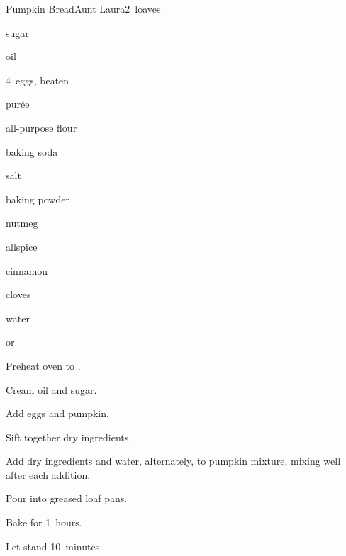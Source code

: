 \begin{recipe}{Pumpkin Bread}{Aunt Laura}{2~loaves}

\begin{ingredients}
\item {} sugar
\item {} oil
\item 4~eggs, beaten
\item {}  pur\'ee
\item \C{3\half} all-purpose flour
\item {} baking soda
\item {} salt
\item {} baking powder
\item {} nutmeg
\item {} allspice
\item {} cinnamon
\item \tp{\half} cloves
\item \C{\twothird} water
\item \C{\half}  or 
\end{ingredients}

\begin{directions}
\item Preheat oven to .
\item Cream oil and sugar.
\item Add eggs and pumpkin.
\item Sift together dry ingredients.
\item Add dry ingredients and water, alternately, to pumpkin mixture, mixing well after each addition.
\item Pour into greased loaf pans.
\item Bake for 1\half~hours.
\item Let stand 10~minutes.
\end{directions}

\end{recipe}
